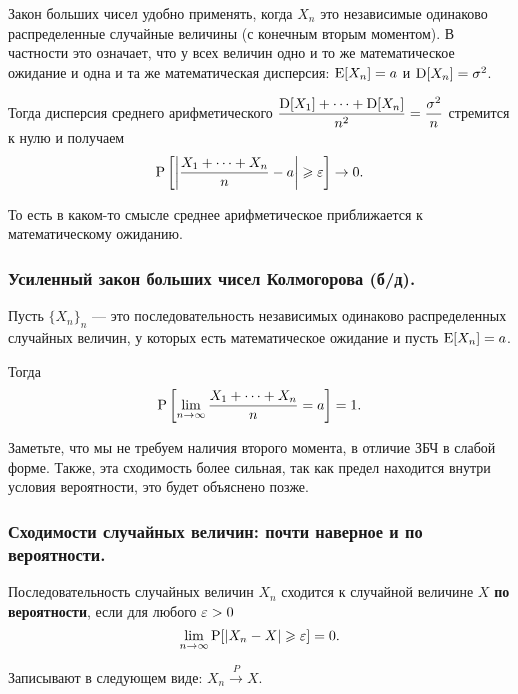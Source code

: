 Закон больших чисел удобно применять, когда $X_n$ это независимые одинаково распределенные случайные величины (с конечным вторым моментом). В частности это означает, что у всех величин одно и то же математическое ожидание и одна и та же математическая дисперсия: $\E[X_n] = a$ и $\D[X_n] = \sigma^2$. 

Тогда дисперсия среднего арифметического $\dfrac{\D[X_1] + \dots + \D[X_n]}{n^2} = \dfrac{\sigma^2}{n}$ стремится к нулю и получаем
\begin{equation*}
    \P\left[\left|\dfrac{X_1 + \dots + X_n}{n} - a\right| \geq \eps\right] \to 0.
\end{equation*}

То есть в каком-то смысле среднее арифметическое приближается к математическому ожиданию.

\subsubsection{Усиленный закон больших чисел Колмогорова (б/д).}

\begin{theorem*}
    Пусть $\{X_n\}_n$ --- это последовательность независимых одинаково распределенных случайных величин, у которых есть математическое ожидание и пусть $\E[X_n] = a$.

    Тогда
    \begin{equation*}
        \P\left[\lim_{n \to \infty} \dfrac{X_1 + \dots + X_n}{n} = a\right] = 1.
    \end{equation*}
\end{theorem*}

Заметьте, что мы не требуем наличия второго момента, в отличие ЗБЧ в слабой форме. Также, эта сходимость более сильная, так как предел находится внутри условия вероятности, это будет объяснено позже.

\subsubsection{Сходимости случайных величин: почти наверное и по вероятности.}

\begin{definition*}
    Последовательность случайных величин $X_n$ сходится к случайной величине $X$ \textbf{по вероятности}, если для любого $\eps > 0$
    \begin{equation*}
        \lim_{n \to \infty} \P[|X_n - X| \geq \eps] = 0.
    \end{equation*}

    Записывают в следующем виде: $X_n \xrightarrow{P} X$.
\end{definition*}

